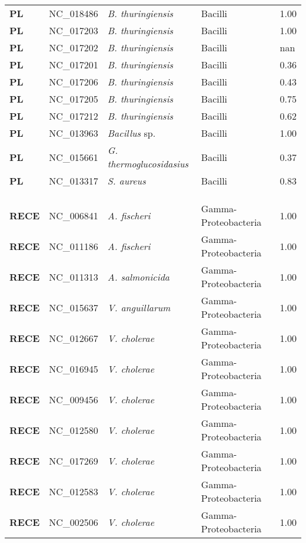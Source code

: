 \begin{adjustwidth}{-3cm}{2cm}
{\begin{supertabular}{>{\bfseries}l|p{0.1\textwidth}p{0.14\textwidth}l|l}
PL & NC\_018486 & \textit{B. thuringiensis} & Bacilli & 1.00\\
PL & NC\_017203 & \textit{B. thuringiensis} & Bacilli & 1.00\\
PL & NC\_017202 & \textit{B. thuringiensis} & Bacilli & nan\\
PL & NC\_017201 & \textit{B. thuringiensis} & Bacilli & 0.36\\
PL & NC\_017206 & \textit{B. thuringiensis} & Bacilli & 0.43\\
PL & NC\_017205 & \textit{B. thuringiensis} & Bacilli & 0.75\\
PL & NC\_017212 & \textit{B. thuringiensis} & Bacilli & 0.62\\
PL & NC\_013963 & \textit{Bacillus} sp. & Bacilli & 1.00\\
PL & NC\_015661 & \textit{G. thermoglucosidasius} & Bacilli & 0.37\\
PL & NC\_013317 & \textit{S. aureus} & Bacilli & 0.83\\
\\
\\
\hline\\
RECE & NC\_006841 & \textit{A. fischeri} & Gamma-Proteobacteria & 1.00\\
RECE & NC\_011186 & \textit{A. fischeri} & Gamma-Proteobacteria & 1.00\\
RECE & NC\_011313 & \textit{A. salmonicida} & Gamma-Proteobacteria & 1.00\\
RECE & NC\_015637 & \textit{V. anguillarum} & Gamma-Proteobacteria & 1.00\\
RECE & NC\_012667 & \textit{V. cholerae} & Gamma-Proteobacteria & 1.00\\
RECE & NC\_016945 & \textit{V. cholerae} & Gamma-Proteobacteria & 1.00\\
RECE & NC\_009456 & \textit{V. cholerae} & Gamma-Proteobacteria & 1.00\\
RECE & NC\_012580 & \textit{V. cholerae} & Gamma-Proteobacteria & 1.00\\
RECE & NC\_017269 & \textit{V. cholerae} & Gamma-Proteobacteria & 1.00\\
RECE & NC\_012583 & \textit{V. cholerae} & Gamma-Proteobacteria & 1.00\\
RECE & NC\_002506 & \textit{V. cholerae} & Gamma-Proteobacteria & 1.00\\

\end{supertabular}}
\end{adjustwidth}

